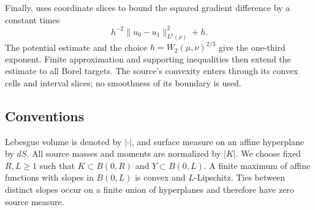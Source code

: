 Finally,  uses coordinate slices to bound the squared
gradient difference by a constant times
\[
 h^{-2}\|u_0-u_1\|_{L^2(\rho)}^2+h.
\]
The potential estimate and the choice \(h=W_2(\mu,\nu)^{2/3}\) give
the one-third exponent. Finite approximation and supporting inequalities
then extend the estimate to all Borel targets. The source's convexity
enters through its convex cells and interval slices; no smoothness of
its boundary is used.

\subsection{Conventions}

Lebesgue volume is denoted by \(|\cdot|\), and surface measure on an affine
hyperplane by \(dS\). All source masses and moments are normalized by
\(|K|\). We choose fixed \(R,L\ge1\) such that
\(K\subset B(0,R)\) and \(Y\subset B(0,L)\). A finite maximum of affine
functions with slopes in \(B(0,L)\) is convex and \(L\)-Lipschitz.
Ties between distinct slopes occur on a finite union of hyperplanes and
therefore have zero source measure.
